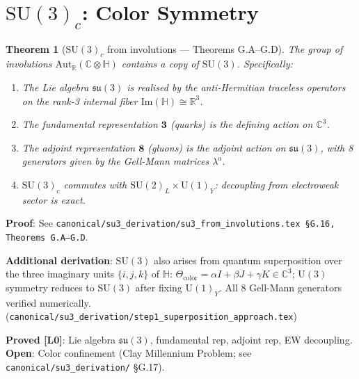 \documentclass[11pt,a4paper]{article}
\newtheorem{theorem}{Theorem}[section]
\theoremstyle{definition}
\theoremstyle{remark}
\begin{document}
\section{$\mathrm{SU}(3)_c$: Color Symmetry}\label{sec:su3}

\begin{theorem}[$\mathrm{SU}(3)_c$ from involutions — Theorems G.A--G.D]
\label{thm:su3}
The group of involutions $\mathrm{Aut}_{\mathbb{R}}(\mathbb{C}\otimes\mathbb{H})$
contains a copy of $\mathrm{SU}(3)$.  Specifically:
\begin{enumerate}
  \item[(G.A)] The Lie algebra $\mathfrak{su}(3)$ is realised by the
    anti-Hermitian traceless operators on the rank-3 internal fiber
    $\mathrm{Im}(\mathbb{H}) \cong \mathbb{R}^3$.
  \item[(G.B)] The fundamental representation $\mathbf{3}$
    (quarks) is the defining action on $\mathbb{C}^3$.
  \item[(G.C)] The adjoint representation $\mathbf{8}$
    (gluons) is the adjoint action on $\mathfrak{su}(3)$,
    with 8 generators given by the Gell-Mann matrices $\lambda^a$.
  \item[(G.D)] $\mathrm{SU}(3)_c$ commutes with
    $\mathrm{SU}(2)_L \times \mathrm{U}(1)_Y$: decoupling from
    electroweak sector is exact.
\end{enumerate}
\end{theorem}

\noindent\textbf{Proof}: See \texttt{canonical/su3\_derivation/su3\_from\_involutions.tex
  \S G.16, Theorems G.A--G.D}.

\noindent\textbf{Additional derivation}:
$\mathrm{SU}(3)$ also arises from quantum superposition over the three imaginary
units $\{i,j,k\}$ of $\mathbb{H}$:
$\Theta_{\mathrm{color}} = \alpha I + \beta J + \gamma K \in \mathbb{C}^3$;
$\mathrm{U}(3)$ symmetry reduces to $\mathrm{SU}(3)$ after fixing $\mathrm{U}(1)_Y$.
All 8 Gell-Mann generators verified numerically.
(\texttt{canonical/su3\_derivation/step1\_superposition\_approach.tex})

\begin{tcolorbox}[colback=green!4!white,colframe=green!50!black,title=Status summary — SU(3)]
\textbf{Proved [L0]}: Lie algebra $\mathfrak{su}(3)$, fundamental rep, adjoint rep,
EW decoupling. \\
\textbf{Open}: Color confinement (Clay Millennium Problem; see
\texttt{canonical/su3\_derivation/} \S G.17).
\end{tcolorbox}
\end{document}
